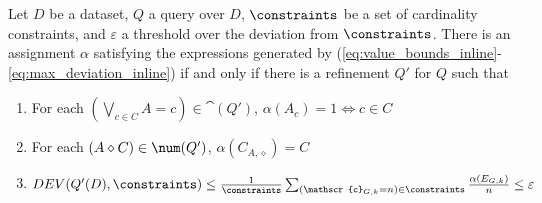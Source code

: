 \begin{theorem}
\label{thm:bounded-deviation}
    Let $D$ be a dataset, $Q$ a query over $D$, $\constraints$ be a set of cardinality constraints, and $\varepsilon$ a threshold over the deviation from $\constraints$. There is an assignment $\alpha$ satisfying the expressions generated by (\ref{eq:value_bounds_inline}-\ref{eq:max_deviation_inline}) if and only if there is a refinement $Q'$ for $Q$ such that 
    \begin{enumerate}[label=\numbercircled{\arabic*}]
        \item For each $(\bigvee_{c \in C} A = c) \in \cat(Q')$, $\alpha(A_c) = 1 \iff c \in C$
        \item For each $(A \diamond C) \in \num(Q')$, $\alpha(C_{A, \diamond}) = C$
        \item $DEV(Q'(D), \constraints) \leq \frac{1}{\constraints}\sum_{(\mathscr{c}_{G, k} = n) \in \constraints} \frac{\alpha(E_{G, k})}{n} \leq \varepsilon$
    \end{enumerate}
\end{theorem}
\iftechreport
